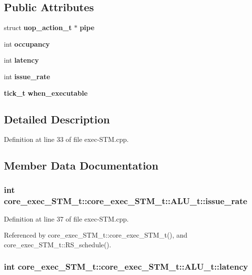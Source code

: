 \subsection*{Public Attributes}
\begin{CompactItemize}
\item 
struct {\bf uop\_\-action\_\-t} $\ast$ {\bf pipe}
\item 
int {\bf occupancy}
\item 
int {\bf latency}
\item 
int {\bf issue\_\-rate}
\item 
{\bf tick\_\-t} {\bf when\_\-executable}
\end{CompactItemize}


\subsection{Detailed Description}


Definition at line 33 of file exec-STM.cpp.

\subsection{Member Data Documentation}
\subsubsection[{issue\_\-rate}]{\setlength{\rightskip}{0pt plus 5cm}int core\_\-exec\_\-STM\_\-t::core\_\-exec\_\-STM\_\-t::ALU\_\-t::issue\_\-rate}\label{structcore__exec__STM__t_1_1ALU__t_7e917ce5d567e2e992499f31a604467f}




Definition at line 37 of file exec-STM.cpp.

Referenced by core\_\-exec\_\-STM\_\-t::core\_\-exec\_\-STM\_\-t(), and core\_\-exec\_\-STM\_\-t::RS\_\-schedule().
\subsubsection[{latency}]{\setlength{\rightskip}{0pt plus 5cm}int core\_\-exec\_\-STM\_\-t::core\_\-exec\_\-STM\_\-t::ALU\_\-t::latency}\label{structcore__exec__STM__t_1_1ALU__t_189bfaf92480d1feb80e474e2a0a58f0}




